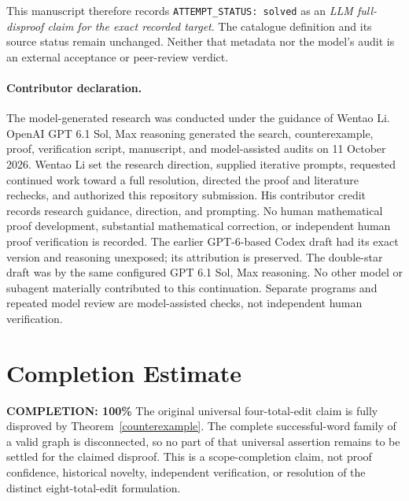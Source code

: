 \documentclass[11pt]{article}
\begin{document}
This manuscript therefore records \texttt{ATTEMPT\_STATUS: solved} as an
\emph{LLM full-disproof claim for the exact recorded target}. The catalogue
definition and its source status remain unchanged. Neither that metadata
nor the model's audit is an external acceptance or peer-review verdict.

\paragraph{Contributor declaration.}
The model-generated research was conducted under the guidance of
Wentao Li. OpenAI GPT 6.1 Sol, Max reasoning generated the search,
counterexample, proof, verification script, manuscript, and model-assisted
audits on 11 October 2026. Wentao Li set the research direction, supplied
iterative prompts, requested continued work toward a full resolution,
directed the proof and literature rechecks, and authorized this repository
submission. His contributor credit records research guidance, direction,
and prompting. No human mathematical proof development, substantial
mathematical correction, or independent human proof verification is recorded.
The earlier GPT-6-based Codex draft had its
exact version and reasoning unexposed; its attribution is preserved.
The double-star draft was by the same configured GPT 6.1 Sol, Max reasoning.
No other model or subagent materially contributed to this continuation.
Separate programs and repeated model review are model-assisted checks,
not independent human verification.

\section{Completion Estimate}
\noindent\textbf{COMPLETION: 100\%}
The original universal four-total-edit claim is fully disproved by
Theorem~\ref{counterexample}. The complete successful-word family of a
valid graph is disconnected, so no part of that universal assertion remains
to be settled for the claimed disproof. This is a scope-completion claim,
not proof confidence, historical novelty, independent verification, or
resolution of the distinct eight-total-edit formulation.
\end{document}
